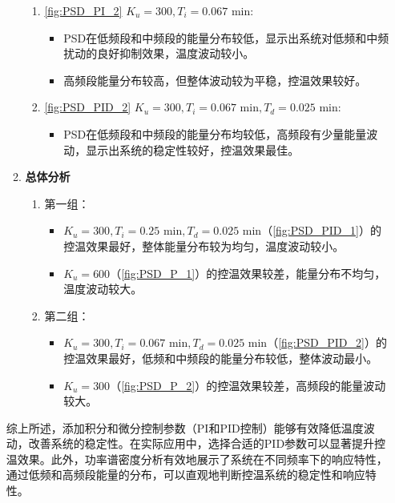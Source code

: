 \documentclass[dvipsnames, svgnames,a4paper,11pt]{article}
\begin{document}
\begin{enumerate}
\begin{enumerate}
\begin{enumerate}
                \item \cref{fig:PSD_PI_2} \( K_u = 300, T_i = 0.067 \text{ min} \):
                \begin{itemize}
                    \item PSD在低频段和中频段的能量分布较低，显示出系统对低频和中频扰动的良好抑制效果，温度波动较小。
                    \item 高频段能量分布较高，但整体波动较为平稳，控温效果较好。
                \end{itemize}
                
                \item \cref{fig:PSD_PID_2} \( K_u = 300, T_i = 0.067 \text{ min}, T_d = 0.025 \text{ min} \):
                \begin{itemize}
                    \item PSD在低频段和中频段的能量分布均较低，高频段有少量能量波动，显示出系统的稳定性较好，控温效果最佳。
                \end{itemize}
            \end{enumerate}
        
            \item \textbf{总体分析}
            \begin{enumerate}
                \item 第一组：
                \begin{itemize}
                    \item \( K_u = 300, T_i = 0.25 \text{ min}, T_d = 0.025 \text{ min} \)（\cref{fig:PSD_PID_1}）的控温效果最好，整体能量分布较为均匀，温度波动较小。
                    \item \( K_u = 600 \)（\cref{fig:PSD_P_1}）的控温效果较差，能量分布不均匀，温度波动较大。
                \end{itemize}
                
                \item 第二组：
                \begin{itemize}
                    \item \( K_u = 300, T_i = 0.067 \text{ min}, T_d = 0.025 \text{ min} \)（\cref{fig:PSD_PID_2}）的控温效果最好，低频和中频段的能量分布较低，整体波动最小。
                    \item \( K_u = 300 \)（\cref{fig:PSD_P_2}）的控温效果较差，高频段的能量波动较大。
                \end{itemize}
            \end{enumerate}
        \end{enumerate}
        
        综上所述，添加积分和微分控制参数（PI和PID控制）能够有效降低温度波动，改善系统的稳定性。在实际应用中，选择合适的PID参数可以显著提升控温效果。此外，功率谱密度分析有效地展示了系统在不同频率下的响应特性，通过低频和高频段能量的分布，可以直观地判断控温系统的稳定性和响应特性。
        

    \end{enumerate}
\end{document}
